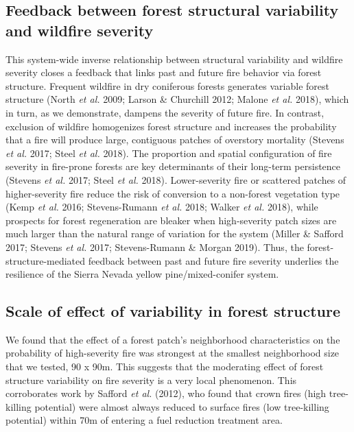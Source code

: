 \documentclass[]{article}
\begin{document}
\hypertarget{feedback-between-forest-structural-variability-and-wildfire-severity}{%
\subsection{Feedback between forest structural variability and wildfire
severity}\label{feedback-between-forest-structural-variability-and-wildfire-severity}}

This system-wide inverse relationship between structural variability and
wildfire severity closes a feedback that links past and future fire
behavior via forest structure. Frequent wildfire in dry coniferous
forests generates variable forest structure (North \emph{et al.} 2009;
Larson \& Churchill 2012; Malone \emph{et al.} 2018), which in turn, as
we demonstrate, dampens the severity of future fire. In contrast,
exclusion of wildfire homogenizes forest structure and increases the
probability that a fire will produce large, contiguous patches of
overstory mortality (Stevens \emph{et al.} 2017; Steel \emph{et al.}
2018). The proportion and spatial configuration of fire severity in
fire-prone forests are key determinants of their long-term persistence
(Stevens \emph{et al.} 2017; Steel \emph{et al.} 2018). Lower-severity
fire or scattered patches of higher-severity fire reduce the risk of
conversion to a non-forest vegetation type (Kemp \emph{et al.} 2016;
Stevens-Rumann \emph{et al.} 2018; Walker \emph{et al.} 2018), while
prospects for forest regeneration are bleaker when high-severity patch
sizes are much larger than the natural range of variation for the system
(Miller \& Safford 2017; Stevens \emph{et al.} 2017; Stevens-Rumann \&
Morgan 2019). Thus, the forest-structure-mediated feedback between past
and future fire severity underlies the resilience of the Sierra Nevada
yellow pine/mixed-conifer system.

\hypertarget{scale-of-effect-of-variability-in-forest-structure}{%
\subsection{Scale of effect of variability in forest
structure}\label{scale-of-effect-of-variability-in-forest-structure}}

We found that the effect of a forest patch's neighborhood
characteristics on the probability of high-severity fire was strongest
at the smallest neighborhood size that we tested, 90 x 90m. This
suggests that the moderating effect of forest structure variability on
fire severity is a very local phenomenon. This corroborates work by
Safford \emph{et al.} (2012), who found that crown fires (high
tree-killing potential) were almost always reduced to surface fires (low
tree-killing potential) within 70m of entering a fuel reduction
treatment area.
\end{document}
